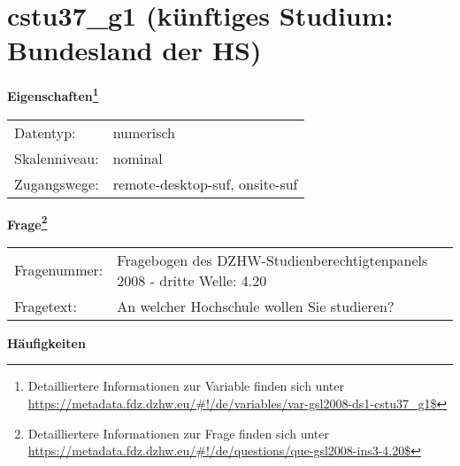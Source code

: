
    \setcounter{footnote}{0}

    \vspace*{-1.8cm}
	\section{cstu37\_g1 (künftiges Studium: Bundesland der HS)}
	\label{section:cstu37_g1}



    \vspace*{0.5cm}
    \noindent\textbf{Eigenschaften\footnote{Detailliertere Informationen zur Variable finden sich unter
		\url{https://metadata.fdz.dzhw.eu/\#!/de/variables/var-gsl2008-ds1-cstu37_g1$}}}\\
	\begin{tabularx}{\hsize}{@{}lX}
	Datentyp: & numerisch \\
	Skalenniveau: & nominal \\
	Zugangswege: &
	  remote-desktop-suf, 
	  onsite-suf
 \\
    \end{tabularx}



				\vspace*{0.5cm}
                \noindent\textbf{Frage\footnote{Detailliertere Informationen zur Frage finden sich unter
		              \url{https://metadata.fdz.dzhw.eu/\#!/de/questions/que-gsl2008-ins3-4.20$}}}\\
				\begin{tabularx}{\hsize}{@{}lX}
					Fragenummer: &
					  Fragebogen des DZHW-Studienberechtigtenpanels 2008 - dritte Welle:
					  4.20
 \\
					Fragetext: & An welcher Hochschule wollen Sie studieren? \\
				\end{tabularx}





        		\vspace*{0.5cm}
                \noindent\textbf{Häufigkeiten}

